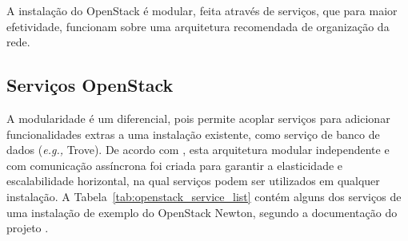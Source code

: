 A instalação do OpenStack é modular, feita através de serviços, que para maior efetividade, funcionam sobre uma arquitetura recomendada de organização da rede.
%
\subsection{Serviços OpenStack}

A modularidade é um diferencial, pois permite acoplar serviços para adicionar funcionalidades extras a uma instalação existente, como serviço de banco de dados (\textit{e.g.,} Trove).
%
De acordo com , esta arquitetura modular independente e com comunicação assíncrona foi criada para garantir a elasticidade e escalabilidade horizontal, na qual serviços podem ser utilizados em qualquer instalação.
%
A Tabela~\ref{tab:openstack_service_list} contém alguns dos serviços de uma instalação de exemplo do OpenStack Newton, segundo a documentação do projeto \cite{openstack:newton}.

